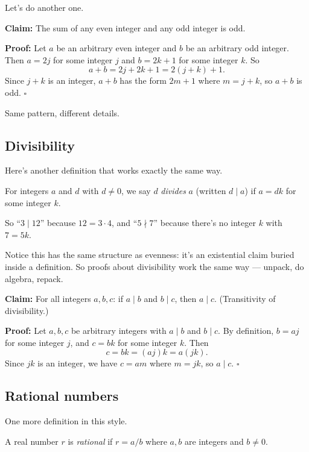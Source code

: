 \documentclass[11pt]{article}
\begin{document}
Let's do another one.

\textbf{Claim:} The sum of any even integer and any odd integer is odd.

\textbf{Proof:} Let $a$ be an arbitrary even integer and $b$ be an arbitrary odd integer. Then $a = 2j$ for some integer $j$ and $b = 2k + 1$ for some integer $k$. So
\[
  a + b = 2j + 2k + 1 = 2(j + k) + 1.
\]
Since $j + k$ is an integer, $a + b$ has the form $2m + 1$ where $m = j + k$, so $a + b$ is odd. \hfill $\square$

Same pattern, different details.

\subsection*{Divisibility}

Here's another definition that works exactly the same way.

\begin{definition}[Divisibility]
For integers $a$ and $d$ with $d \neq 0$, we say $d$ \emph{divides} $a$ (written $d \mid a$) if $a = dk$ for some integer $k$.
\end{definition}

So ``$3 \mid 12$'' because $12 = 3 \cdot 4$, and ``$5 \nmid 7$'' because there's no integer $k$ with $7 = 5k$.

Notice this has the same structure as evenness: it's an existential claim buried inside a definition. So proofs about divisibility work the same way --- unpack, do algebra, repack.

\textbf{Claim:} For all integers $a, b, c$: if $a \mid b$ and $b \mid c$, then $a \mid c$. (Transitivity of divisibility.)

\textbf{Proof:} Let $a, b, c$ be arbitrary integers with $a \mid b$ and $b \mid c$. By definition, $b = aj$ for some integer $j$, and $c = bk$ for some integer $k$. Then
\[
  c = bk = (aj)k = a(jk).
\]
Since $jk$ is an integer, we have $c = am$ where $m = jk$, so $a \mid c$. \hfill $\square$

\subsection*{Rational numbers}

One more definition in this style.

\begin{definition}
A real number $r$ is \emph{rational} if $r = a/b$ where $a, b$ are integers and $b \neq 0$.
\end{definition}
\end{document}
